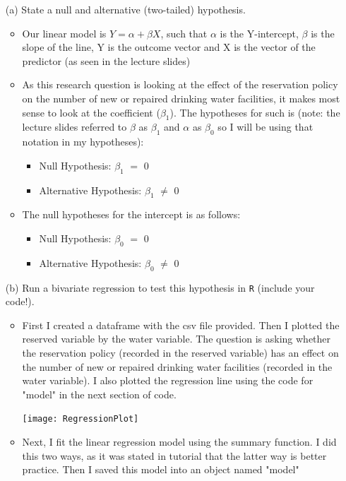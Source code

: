 \documentclass[12pt,letterpaper]{article}
\begin{document}
\newpage
\begin{enumerate}
	\item [(a)] State a null and alternative (two-tailed) hypothesis. 
	
		\begin{itemize}
			\item Our linear model is $Y = \alpha + \beta X$, such that $\alpha$ is the Y-intercept, $\beta$ is the slope of the line, Y is the outcome vector and X is the vector of the predictor (as seen in the lecture slides)
			\item As this research question is looking at the effect of the reservation policy on the number of new or repaired drinking water facilities, it makes most sense to look at the coefficient ($\beta_1$). The hypotheses for such is (note: the lecture slides referred to $\beta$ as $\beta_1$ and $\alpha$ as $\beta_0$ so I will be using that notation in my hypotheses):
				\begin{itemize}
					\item {Null Hypothesis: $\beta_1$ $=$ 0}
					\item {Alternative Hypothesis: $\beta_1$ $\neq$ 0}
				\end{itemize}
			\item The null hypotheses for the intercept is as follows:
				\begin{itemize}
					\item {Null Hypothesis: $\beta_0$ $=$ 0}
					\item {Alternative Hypothesis: $\beta_0$ $\neq$ 0}
				\end{itemize}
		\end{itemize}
	
	\vspace{0cm}
	\item [(b)] Run a bivariate regression to test this hypothesis in \texttt{R} (include your code!).
			
		\begin{itemize}
			\item First I created a dataframe with the csv file provided. Then I plotted the reserved variable by the water variable. The question is asking whether the reservation policy (recorded in the reserved variable) has an effect on the number of new or repaired drinking water facilities (recorded in the water variable). I also plotted the regression line using the code for "model" in the next section of code.
				
				
				\texttt{[image: RegressionPlot]}\hfill
			\item Next, I fit the linear regression model using the summary function. I did this two ways, as it was stated in tutorial that the latter way is better practice. Then I saved this model into an object named "model"
				
				
				
		\end{itemize}
			

\end{enumerate}
\end{document}
